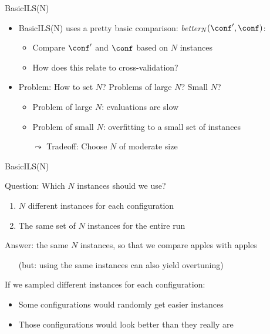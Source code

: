 \begin{frame}[c,fragile]{BasicILS(N)}

\begin{itemize}
\item \alert{BasicILS(N)} uses a pretty basic comparison: \textit{better$_N(\conf', \conf)$}:
\begin{itemize}
\item Compare $\conf'$ and $\conf$ based on $N$ instances 
\pause
\item How does this relate to cross-validation? \hands
\end{itemize}  

\bigskip
\pause
\item Problem: How to set $N$? Problems of large $N$? Small $N$? \hands
\pause
\begin{itemize}
\item Problem of large $N$: evaluations are slow
\item Problem of small $N$: overfitting to a small set of instances
\item[$\leadsto$] Tradeoff: Choose $N$ of moderate size 
\end{itemize}

\end{itemize}
\end{frame}


\begin{frame}[c,fragile]{BasicILS(N)}


Question: \alert{Which} $N$ instances should we use? \hands
\begin{enumerate}
\item $N$ different instances for each configuration
\item The same set of $N$ instances for the entire run
\end{enumerate}

\bigskip
\pause
Answer: the same $N$ instances, so that we compare apples with apples
\begin{itemize}
\item[] (but: using the same instances can also yield overtuning) 
\end{itemize}
\bigskip


If we sampled different instances for each configuration:
\begin{itemize}
\item Some configurations would randomly get easier instances
\item Those configurations would look better than they really are
\end{itemize}

\end{frame}



